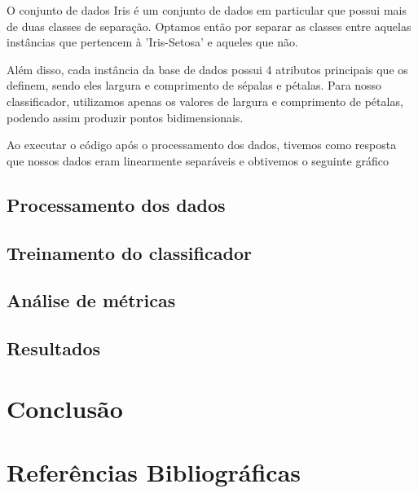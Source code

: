 \documentclass{article}
\begin{document}
O conjunto de dados Iris é um conjunto de dados em particular que possui mais de duas classes de separação. Optamos então por separar as classes entre aquelas instâncias que pertencem à 'Iris-Setosa' e aqueles que não. 

Além disso, cada instância da base de dados possui 4 atributos principais que os definem, sendo eles largura e comprimento de sépalas e pétalas. Para nosso classificador, utilizamos apenas os valores de largura e comprimento de pétalas, podendo assim produzir pontos bidimensionais.

Ao executar o código após o processamento dos dados, tivemos como resposta que nossos dados eram linearmente separáveis e obtivemos o seguinte gráfico

\subsection{Processamento dos dados}

\subsection{Treinamento do classificador}

\subsection{Análise de métricas}

\subsection{Resultados}

\section{Conclusão}

\section{Referências Bibliográficas}
\end{document}
